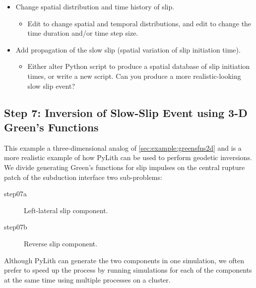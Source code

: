 \begin{itemize}
\item Change spatial distribution and time history of slip.
  \begin{itemize}
  \item Edit  to change spatial and
    temporal distributions, and edit  to change the
    time duration and/or time step size.
  \end{itemize}
\item Add propagation of the slow slip (spatial variation of slip
  initiation time).
  \begin{itemize}
  \item Either alter Python script to produce a spatial database of
    slip initiation times, or write a new script. Can you produce a
    more realistic-looking slow slip event?
  \end{itemize}
\end{itemize}

\subsection{Step 7: Inversion of Slow-Slip Event using 3-D Green's Functions}

This example a three-dimensional analog of
\vref{sec:example:greensfns2d} and is a more realistic example of how
PyLith can be used to perform geodetic inversions. We divide
generating Green's functions for slip impulses on the central rupture
patch of the subduction interface two sub-problems:
\begin{description}
 \item[step07a] Left-lateral slip component.
 \item[step07b] Reverse slip component.
\end{description}
Although PyLith can generate the two components in one simulation, we
often prefer to speed up the process by running simulations for each
of the components at the same time using multiple processes on a cluster.

